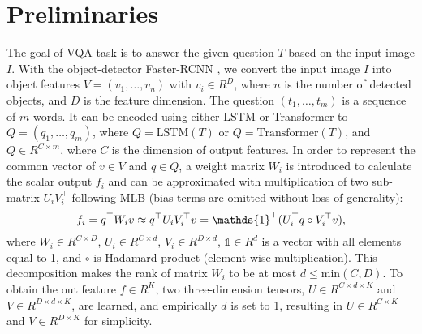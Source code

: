 \documentclass[10pt,twocolumn,letterpaper]{article}
\begin{document}
\section{Preliminaries}
The goal of VQA task is to answer the given question $T$ based on the input image $I$. With the object-detector Faster-RCNN \cite{ren2015faster, anderson2018bottom}, we convert the input image $I$ into object features $V = (v_1, \dots, v_n)$ with $v_i \in R^D$, where $n$ is the number of detected objects, and $D$ is the feature dimension. The question $(t_1, \dots, t_m)$ is a sequence of $m$ words. It can be encoded using either LSTM \cite{hochreiter1997long} or Transformer \cite{vaswani2017attention, devlin2018bert} to $Q = (q_1, \dots, q_m)$, where $Q = \text{LSTM}(T)$ or $Q = \text{Transformer}(T)$, and $Q \in R^{C \times m}$, where $C$ is the dimension of output features. In order to represent the common vector of $v \in V$ and $q \in Q$, a weight matrix $W_i$ is introduced to calculate the scalar output $f_i$ and can be approximated with multiplication of two sub-matrix $U_iV_i^\top$ following MLB \cite{kim2016hadamard} (bias terms are omitted without loss of generality):
\vspace{-5pt}
\begin{equation} \label{eq:mlb}
f_i = q^\top W_i v \approx q^\top U_i V_i^\top v = \mathds{1}^\top (U_i^\top q \circ V_i^ \top v),
\vspace{-5pt}
\end{equation}
where $W_i \in R^{C \times D}$, $U_i \in R^{C \times d}$, $V_i \in R^{D \times d}$, $\mathds{1} \in R^d$ is a vector with all elements equal to 1, and $\circ$ is Hadamard product (element-wise multiplication). This decomposition makes the rank of matrix $W_i$ to be at most $d \le \text{min}(C, D)$. To obtain the out feature $f \in R^K$, two three-dimension tensors, $U \in R^{C \times d \times K}$ and $V \in R^{D \times d \times K}$, are learned, and empirically $d$ is set to 1, resulting in $U \in R^{C \times K}$ and $V \in R^{D \times K}$ for simplicity. 
\end{document}

